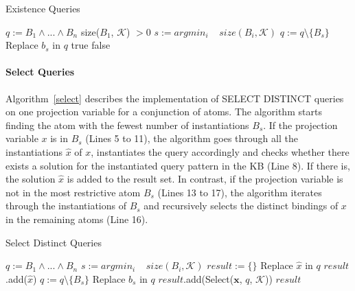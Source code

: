 \begin{algorithm}
\caption{Existence Queries}
\label{exists}
\begin{algorithmic}[1]
    \State $q := B_1 \wedge ... \wedge B_n$
      \State \Return size($B_1$, $\mathcal{K}$) $> 0$
    \Else
      \State $s := argmin_i\;\;\;\; size(B_i, \mathcal{K})$
      \State $q := q \setminus \{ B_s \} $
	\State Replace $b_s$ in $q$
	    \State \Return true
	  \EndIf
      \EndFor
    \EndIf
    \State \Return false
\EndFunction
\end{algorithmic}
\end{algorithm}

\paragraph{Select Queries} 
Algorithm~\ref{select} describes the implementation of SELECT DISTINCT queries on one projection variable for a conjunction of
atoms. 
The algorithm starts finding the atom with the fewest number 
of instantiations $B_s$. If the projection variable $x$ is in $B_s$ (Lines 5 to 11), 
the algorithm goes through all the instantiations $\hat{x}$ of $x$, instantiates
the query accordingly and checks whether there exists a solution for the instantiated query pattern in the KB (Line 8). 
If there is, the solution $\hat{x}$ is added to the result set. In contrast, if the projection variable is not in the most 
restrictive atom $B_s$ (Lines 13 to 17), the algorithm iterates through the instantiations of $B_s$ and recursively selects the distinct
bindings of $x$ in the remaining atoms (Line 16).

\begin{algorithm}
\caption{Select Distinct Queries}
\label{select}
\begin{algorithmic}[1]
    \State $q := B_1 \wedge ... \wedge B_n$
    \State $s := argmin_i\;\;\;\; size(B_i, \mathcal{K})$
    \State $result := \lbrace \rbrace$
	\State Replace $\hat{x}$ in $q$
	  \State $result$.add($\hat{x}$)
	\EndIf
      \EndFor
    \Else
      \State $q := q \setminus \{ B_s\}$
      	\State Replace $b_s$ in $q$
      	\State $result$.add(Select($\bm{x}$, $q$, $\mathcal{K}$))
      \EndFor
    \EndIf
    \State \Return $result$
\EndFunction
\end{algorithmic}
\end{algorithm}

